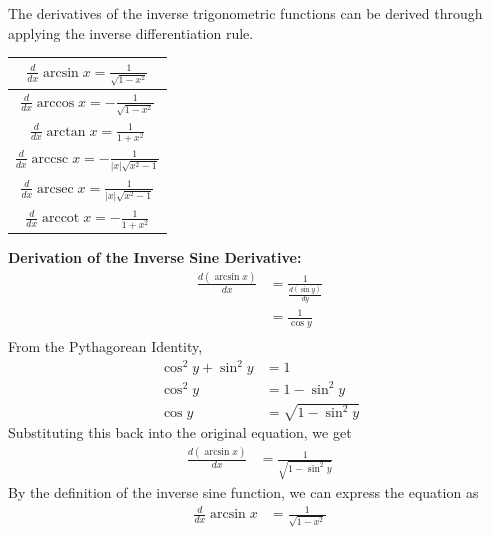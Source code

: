 \documentclass{article}
\DeclareMathOperator{\arcsec}{arcsec}
\DeclareMathOperator{\arccot}{arccot}
\DeclareMathOperator{\arccsc}{arccsc}
\begin{document}
            \noindent The derivatives of the inverse trigonometric functions can be derived through
            applying the inverse differentiation rule. \\

            \begin{center}
                \begin{tabular}{|c|}
                    \hline
                    $\frac{d}{dx}\arcsin{x} = \frac{1}{\sqrt{1-x^2}}$ \\
                    \hline
                    $\frac{d}{dx}\arccos{x} = -\frac{1}{\sqrt{1-x^2}}$ \\
                    \hline
                    $\frac{d}{dx}\arctan{x} = \frac{1}{1+x^2}$ \\
                    \hline
                    $\frac{d}{dx}\arccsc{x} = -\frac{1}{|x|\sqrt{x^2-1}}$ \\
                    \hline
                    $\frac{d}{dx}\arcsec{x} = \frac{1}{|x|\sqrt{x^2-1}}$ \\
                    \hline
                    $\frac{d}{dx}\arccot{x} = -\frac{1}{1+x^2}$ \\
                    \hline
                \end{tabular}
            \end{center}


            \noindent \color{purple} \textbf{Derivation of the Inverse Sine Derivative:} \color{black} \\
            \begin{align*}
                \frac{d(\arcsin{x})}{dx} &= \frac{1}{\frac{d(\sin{y})}{dy}} \\
                &= \frac{1}{\cos{y}} \\
            \end{align*}
            \noindent From the Pythagorean Identity, \\
            \begin{align*}
                \cos^2{y} + \sin^2{y} &= 1 \\
                \cos^2{y} &= 1 - \sin^2{y} \\
                \cos{y} &= \sqrt{1-\sin^2{y}}
            \end{align*}
            \noindent Substituting this back into the original equation, we get \\
            \begin{align*}
                \frac{d(\arcsin{x})}{dx} &= \frac{1}{\sqrt{1-\sin^2{y}}}
            \end{align*}
            \noindent By the definition of the inverse sine function, we can express the equation as \\
            \begin{align*}
                \frac{d}{dx}\arcsin{x} &= \frac{1}{\sqrt{1-x^2}}
            \end{align*}
\end{document}
